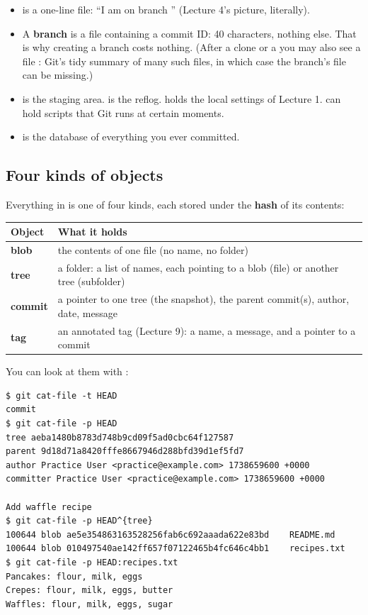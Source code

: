 \begin{itemize}
  \item {} is a one-line file: ``I am on branch '' (Lecture 4's picture, literally).
  \item A \textbf{branch} is a file containing a commit ID: 40 characters, nothing else. That is why creating a branch costs nothing. (After a clone or a  you may also see a file : Git's tidy summary of many such files, in which case the branch's file can be missing.)
  \item {} is the staging area.  is the reflog.  holds the local settings of Lecture 1.  can hold scripts that Git runs at certain moments.
  \item {} is the database of everything you ever committed.
\end{itemize}

\subsection{Four kinds of objects}

Everything in  is one of four kinds, each stored under the \textbf{hash} of its contents:

\begin{center}
\small
\begin{tabular}{@{}l >{\raggedright\arraybackslash}p{10.8cm}@{}}
\toprule
Object & What it holds \\
\midrule
\textbf{blob} & the contents of one file (no name, no folder) \\
\textbf{tree} & a folder: a list of names, each pointing to a blob (file) or another tree (subfolder) \\
\textbf{commit} & a pointer to one tree (the snapshot), the parent commit(s), author, date, message \\
\textbf{tag} & an annotated tag (Lecture 9): a name, a message, and a pointer to a commit \\
\bottomrule
\end{tabular}
\end{center}

You can look at them with :

\begin{lstlisting}
$ git cat-file -t HEAD
commit
$ git cat-file -p HEAD
tree aeba1480b8783d748b9cd09f5ad0cbc64f127587
parent 9d18d71a8420fffe8667946d288bfd39d1ef5fd7
author Practice User <practice@example.com> 1738659600 +0000
committer Practice User <practice@example.com> 1738659600 +0000

Add waffle recipe
$ git cat-file -p HEAD^{tree}
100644 blob ae5e354863163528256fab6c692aaada622e83bd	README.md
100644 blob 010497540ae142ff657f07122465b4fc646c4bb1	recipes.txt
$ git cat-file -p HEAD:recipes.txt
Pancakes: flour, milk, eggs
Crepes: flour, milk, eggs, butter
Waffles: flour, milk, eggs, sugar
\end{lstlisting}

